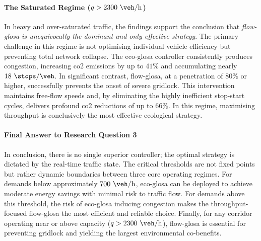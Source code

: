 \paragraph{The Saturated Regime ($q > 2300~\unit{\veh\per\hour}$)}
In heavy and over-saturated traffic, the findings support the conclusion that \textit{\ac{flow-glosa} is unequivocally the dominant and only effective strategy}. The primary challenge in this regime is not optimising individual vehicle efficiency but preventing total network collapse. The \ac{eco-glosa} controller consistently produces congestion, increasing \ac{co2} emissions by up to $41\%$ and accumulating nearly $18~\unit{\stops\per\veh}$. In significant contrast, \ac{flow-glosa}, at a penetration of $80\%$ or higher, successfully prevents the onset of severe gridlock. This intervention maintains free-flow speeds and, by eliminating the highly inefficient stop-start cycles, delivers profound \ac{co2} reductions of up to $66\%$. In this regime, maximising throughput is conclusively the most effective ecological strategy.

\paragraph{Final Answer to Research Question 3}
In conclusion, there is no single superior controller; the optimal strategy is dictated by the real-time traffic state. The critical thresholds are not fixed points but rather dynamic boundaries between three core operating regimes. For demands below approximately $700~\unit{\veh\per\hour}$, \ac{eco-glosa} can be deployed to achieve moderate energy savings with minimal risk to traffic flow. For demands above this threshold, the risk of \ac{eco-glosa} inducing congestion makes the throughput-focused \ac{flow-glosa} the most efficient and reliable choice. Finally, for any corridor operating near or above capacity ($q > 2300~\unit{\veh\per\hour}$), \ac{flow-glosa} is essential for preventing gridlock and yielding the largest environmental co-benefits.

